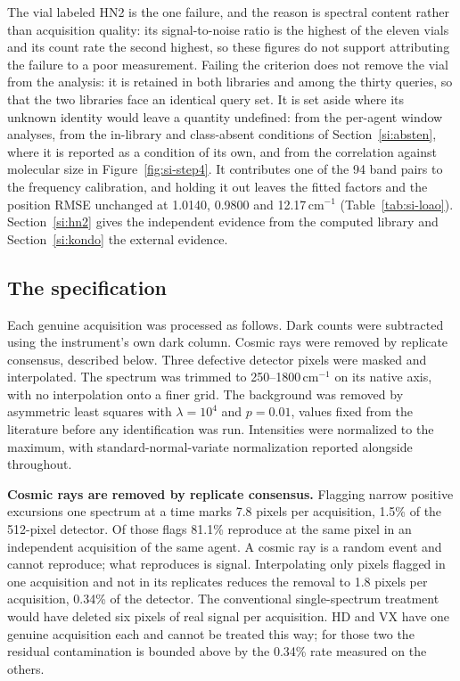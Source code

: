\documentclass[11pt]{article}
\newcommand*\wn{\ensuremath{\text{cm}^{-1}}}
\begin{document}
\begin{table}[htbp]
\begin{flushleft}\footnotesize The vial labeled HN2 is the one failure, and the reason is spectral content rather than acquisition quality: its signal-to-noise ratio is the highest of the eleven vials and its count rate the second highest, so these figures do not support attributing the failure to a poor measurement. Failing the criterion does not remove the vial from the analysis: it is retained in both libraries and among the thirty queries, so that the two libraries face an identical query set. It is set aside where its unknown identity would leave a quantity undefined: from the per-agent window analyses, from the in-library and class-absent conditions of Section~\ref{si:absten}, where it is reported as a condition of its own, and from the correlation against molecular size in Figure~\ref{fig:si-step4}. It contributes one of the 94 band pairs to the frequency calibration, and holding it out leaves the fitted factors and the position RMSE unchanged at 1.0140, 0.9800 and 12.17\,\wn{} (Table~\ref{tab:si-loao}). Section~\ref{si:hn2} gives the independent evidence from the computed library and Section~\ref{si:kondo} the external evidence.\end{flushleft}
\end{table}
\clearpage

\subsection{The specification}

Each genuine acquisition was processed as follows. Dark counts were subtracted using the
instrument's own dark column. Cosmic rays were removed by replicate consensus, described
below. Three defective detector pixels were masked and interpolated. The spectrum was
trimmed to 250--1800\,\wn{} on its native axis, with no interpolation onto a finer grid.
The background was removed by asymmetric least squares with $\lambda = 10^4$ and
$p = 0.01$, values fixed from the literature before any identification was run. Intensities
were normalized to the maximum, with standard-normal-variate normalization reported
alongside throughout.

\textbf{Cosmic rays are removed by replicate consensus.} Flagging narrow positive
excursions one spectrum at a time marks 7.8 pixels per acquisition, 1.5\% of the
512-pixel detector. Of those flags 81.1\% reproduce at the same pixel in an independent
acquisition of the same agent. A cosmic ray is a random event and cannot reproduce; what
reproduces is signal. Interpolating only pixels flagged in one acquisition and not in its
replicates reduces the removal to 1.8 pixels per acquisition, 0.34\% of the detector. The
conventional single-spectrum treatment would have deleted six pixels of real signal per
acquisition. HD and VX have one genuine acquisition each and cannot be treated this way;
for those two the residual contamination is bounded above by the 0.34\% rate measured on
the others.
\end{document}
